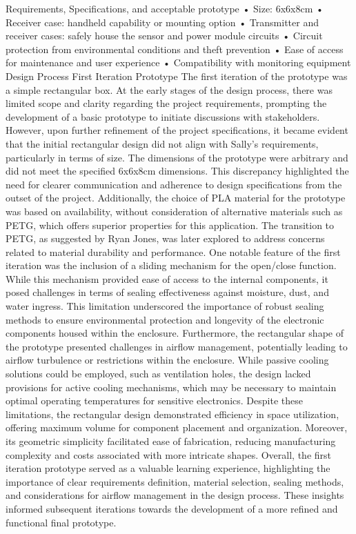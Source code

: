 Requirements, Specifications, and acceptable prototype
•	Size: 6x6x8cm
•	Receiver case: handheld capability or mounting option
•	Transmitter and receiver cases: safely house the sensor and power module circuits
•	Circuit protection from environmental conditions and theft prevention
•	Ease of access for maintenance and user experience
•	Compatibility with monitoring equipment
Design Process
First Iteration Prototype
The first iteration of the prototype was a simple rectangular box. At the early stages of the design process, there was limited scope and clarity regarding the project requirements, prompting the development of a basic prototype to initiate discussions with stakeholders.
However, upon further refinement of the project specifications, it became evident that the initial rectangular design did not align with Sally's requirements, particularly in terms of size. The dimensions of the prototype were arbitrary and did not meet the specified 6x6x8cm dimensions. This discrepancy highlighted the need for clearer communication and adherence to design specifications from the outset of the project.
Additionally, the choice of PLA material for the prototype was based on availability, without consideration of alternative materials such as PETG, which offers superior properties for this application. The transition to PETG, as suggested by Ryan Jones, was later explored to address concerns related to material durability and performance.
One notable feature of the first iteration was the inclusion of a sliding mechanism for the open/close function. While this mechanism provided ease of access to the internal components, it posed challenges in terms of sealing effectiveness against moisture, dust, and water ingress. This limitation underscored the importance of robust sealing methods to ensure environmental protection and longevity of the electronic components housed within the enclosure.
Furthermore, the rectangular shape of the prototype presented challenges in airflow management, potentially leading to airflow turbulence or restrictions within the enclosure. While passive cooling solutions could be employed, such as ventilation holes, the design lacked provisions for active cooling mechanisms, which may be necessary to maintain optimal operating temperatures for sensitive electronics.
Despite these limitations, the rectangular design demonstrated efficiency in space utilization, offering maximum volume for component placement and organization. Moreover, its geometric simplicity facilitated ease of fabrication, reducing manufacturing complexity and costs associated with more intricate shapes.
Overall, the first iteration prototype served as a valuable learning experience, highlighting the importance of clear requirements definition, material selection, sealing methods, and considerations for airflow management in the design process. These insights informed subsequent iterations towards the development of a more refined and functional final prototype.


